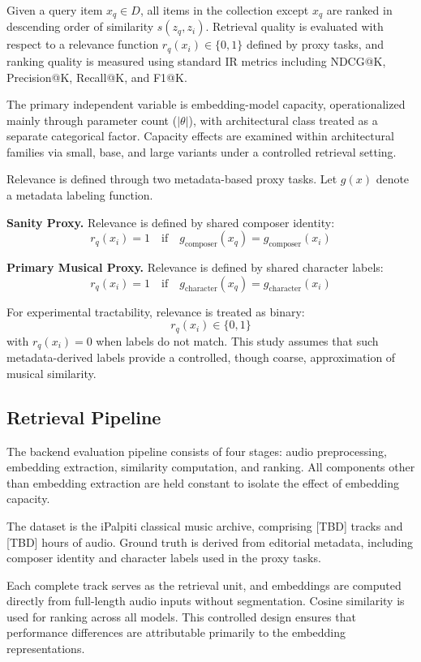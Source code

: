 \documentclass{article}
\begin{document}
Given a query item $x_q \in D$, all items in the collection except $x_q$ are ranked in descending
order of similarity $s(z_q, z_i)$. Retrieval quality is evaluated with respect to a relevance
function $r_q(x_i) \in \{0,1\}$ defined by proxy tasks, and ranking quality is measured using
standard IR metrics including NDCG@K, Precision@K, Recall@K, and F1@K.

The primary independent variable is embedding-model capacity, operationalized mainly through
parameter count ($|\theta|$), with architectural class treated as a separate categorical factor.
Capacity effects are examined within architectural families via small, base, and large variants under
a controlled retrieval setting.

Relevance is defined through two metadata-based proxy tasks. Let $g(x)$ denote a metadata labeling
function.

\textbf{Sanity Proxy.} Relevance is defined by shared composer identity:
\[
r_q(x_i) = 1 \quad \text{if} \quad g_{\text{composer}}(x_q) = g_{\text{composer}}(x_i)
\]

\textbf{Primary Musical Proxy.} Relevance is defined by shared character labels:
\[
r_q(x_i) = 1 \quad \text{if} \quad g_{\text{character}}(x_q) = g_{\text{character}}(x_i)
\]

For experimental tractability, relevance is treated as binary:
\[
r_q(x_i) \in \{0,1\}
\]
with $r_q(x_i)=0$ when labels do not match. This study assumes that such metadata-derived labels
provide a controlled, though coarse, approximation of musical similarity.

\subsection{Retrieval Pipeline}

The backend evaluation pipeline consists of four stages: audio preprocessing, embedding extraction,
similarity computation, and ranking. All components other than embedding extraction are held constant
to isolate the effect of embedding capacity.

The dataset is the iPalpiti classical music archive, comprising [TBD] tracks and [TBD] hours of
audio. Ground truth is derived from editorial metadata, including composer identity and character
labels used in the proxy tasks.

Each complete track serves as the retrieval unit, and embeddings are computed directly from
full-length audio inputs without segmentation. Cosine similarity is used for ranking across all
models. This controlled design ensures that performance differences are attributable primarily to
the embedding representations.
\end{document}
